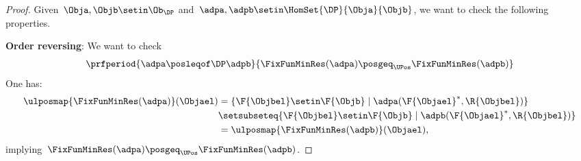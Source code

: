 \begin{proof}
    Given~$\Obja,\Objb \setin \Ob_\DP$ and~$\adpa,\adpb \setin \HomSet{\DP}{\Obja}{\Objb}$, we want to check the following properties.

    \textbf{Order reversing}:
    We want to check
    \begin{equation*}
        \prfperiod{\adpa \posleqof\DP \adpb}{\FixFunMinRes(\adpa) \posgeq_\UPos \FixFunMinRes(\adpb)}
    \end{equation*}
    One has:
    \begin{equation*}
        \begin{aligned}
            \ulposmap{\FixFunMinRes(\adpa)}(\Objael) & =\{\F{\Objbel} \setin \F{\Objb} \mid \adpa(\F{\Objael}^*, \R{\Objbel})\} \\
                                                     & \setsubseteq \{\F{\Objbel} \setin \F{\Objb} \mid \adpb(\F{\Objael}^*, \R{\Objbel})\} \\
                                                     & = \ulposmap{\FixFunMinRes(\adpb)}(\Objael),
        \end{aligned}
    \end{equation*}
    implying~$\FixFunMinRes(\adpa) \posgeq_\UPos \FixFunMinRes(\adpb)$.


\end{proof}
